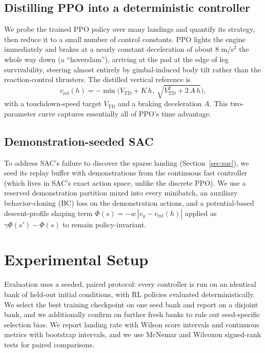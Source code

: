\documentclass[10pt,twocolumn]{article}
\begin{document}
\subsection{Distilling PPO into a deterministic controller}
\label{sec:distill}
We probe the trained PPO policy over many landings and quantify its strategy, then reduce it to a small number of control constants. PPO lights the engine immediately and brakes at a nearly constant deceleration of about 8 m/s$^2$ the whole way down (a ``hoverslam''), arriving at the pad at the edge of leg survivability, steering almost entirely by gimbal-induced body tilt rather than the reaction-control thrusters. The distilled vertical reference is
\begin{equation}
v_{\mathrm{ref}}(h) = -\min\!\big(V_{\mathrm{TD}} + K\,h,\ \sqrt{V_{\mathrm{TD}}^2 + 2\,A\,h}\big),
\end{equation}
with a touchdown-speed target $V_{\mathrm{TD}}$ and a braking deceleration $A$. This two-parameter curve captures essentially all of PPO's time advantage.

\subsection{Demonstration-seeded SAC}
To address SAC's failure to discover the sparse landing (Section~\ref{sec:sac}), we seed its replay buffer with demonstrations from the continuous fast controller (which lives in SAC's exact action space, unlike the discrete PPO). We use a reserved demonstration partition mixed into every minibatch, an auxiliary behavior-cloning (BC) loss on the demonstration actions, and a potential-based descent-profile shaping term $\Phi(s) = -w\,|v_y - v_{\mathrm{ref}}(h)|$ applied as $\gamma\Phi(s')-\Phi(s)$ to remain policy-invariant.

\section{Experimental Setup}

Evaluation uses a seeded, paired protocol: every controller is run on an identical bank of held-out initial conditions, with RL policies evaluated deterministically. We select the best training checkpoint on one seed bank and report on a disjoint bank, and we additionally confirm on further fresh banks to rule out seed-specific selection bias. We report landing rate with Wilson score intervals and continuous metrics with bootstrap intervals, and we use McNemar and Wilcoxon signed-rank tests for paired comparisons.
\end{document}
